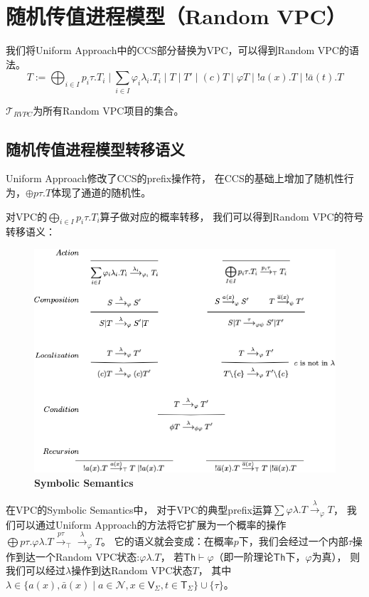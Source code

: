 \section{随机传值进程模型（Random VPC）}
我们将Uniform Approach中的CCS部分替换为VPC，可以得到Random VPC的语法。
$$T:=\bigoplus_{i\in I}p_i \tau.T_i\mid \sum_{i\in I} \varphi_i\lambda_i.T_i\mid T \mid T'\mid (c)T\mid \varphi T\mid !a(x).T \mid !\bar{a}(t).T$$

$\mathcal{T}_{RVPC}$为所有Random VPC项目的集合。

\subsection{随机传值进程模型转移语义}
Uniform Approach修改了CCS的prefix操作符，
在CCS的基础上增加了随机性行为，$\oplus p\tau.T$体现了通道的随机性。

对VPC的$\bigoplus_{i\in I}p_i \tau.T_i$算子做对应的概率转移，
我们可以得到Random VPC的符号转移语义：

\begin{figure}[!htbp]
	\small
	\centering
	\includegraphics[width=13cm]{../figure/symbolic_sematic.png}
    \caption{\textbf{Symbolic Semantics}}
    \label{fig_sematic}
\end{figure}

在VPC的Symbolic Semantics中，
对于VPC的典型prefix运算$\sum \varphi \lambda. T\stackrel{\lambda}{\rightarrow}_{\varphi} T$，
我们可以通过Uniform Approach的方法将它扩展为一个概率的操作
$\bigoplus p\tau.\varphi \lambda. T\stackrel{p\tau}{\rightarrow}_{\top}\stackrel{\lambda}{\rightarrow}_{\varphi} T$。
它的语义就会变成：在概率$p$下，我们会经过一个内部$\tau$操作到达一个Random VPC状态:$\varphi\lambda.T$，
若$\mathsf{Th}\vdash \varphi$（即一阶理论$\mathsf{Th}$下，$\varphi$为真），
则我们可以经过$\lambda$操作到达Random VPC状态$T$， 其中$\lambda \in \{a(x),\bar{a}(x)\mid a\in \mathcal{N}, x\in \mathsf{V}_\Sigma, t\in \mathsf{T}_\Sigma\}\cup \{\tau\}$。

